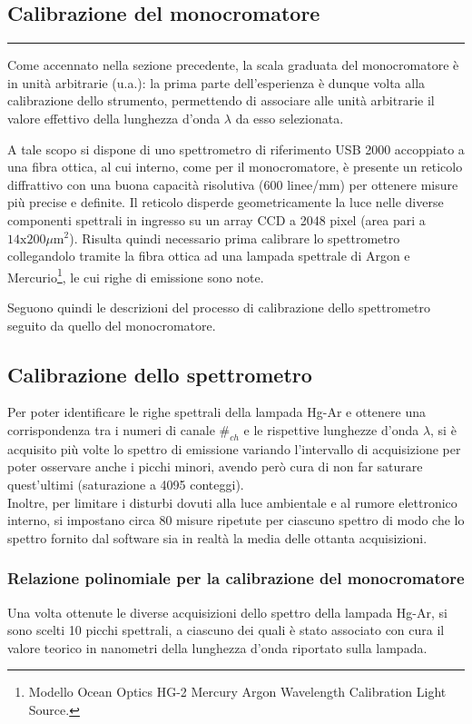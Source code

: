 \begin{center}
  \section{Calibrazione del monocromatore}
\medskip
\end{center}
{\color{gray}\hrule}
\medskip

Come accennato nella sezione precedente, la scala graduata del monocromatore è in unità arbitrarie (u.a.): la prima parte dell'esperienza è dunque volta alla calibrazione dello strumento, permettendo di associare alle unità arbitrarie il valore effettivo della lunghezza d'onda $\lambda$ da esso selezionata. 

A tale scopo si dispone di uno spettrometro di riferimento USB 2000 accoppiato a una fibra ottica, al cui interno, come per il monocromatore, è presente un reticolo diffrattivo con una buona capacità risolutiva ($600$ linee/mm) per ottenere misure più precise e definite. Il reticolo disperde geometricamente la luce nelle diverse componenti spettrali in ingresso su un array CCD a 2048 pixel (area pari a $14 \text{x}200\mu\text{m}^2$). Risulta quindi necessario prima calibrare lo spettrometro collegandolo tramite la fibra ottica ad una lampada spettrale di Argon e Mercurio\footnote{Modello Ocean Optics HG-2 Mercury Argon Wavelength Calibration Light Source.}, le cui righe di emissione sono note.

Seguono quindi le descrizioni del processo di calibrazione dello spettrometro seguito da quello del monocromatore. 


\subsection{Calibrazione dello spettrometro}
Per poter identificare le righe spettrali della lampada Hg-Ar e ottenere una corrispondenza tra i numeri di canale $\#_{ch}$ e le rispettive lunghezze d’onda $\lambda$, si è acquisito più volte lo spettro di emissione variando l'intervallo di acquisizione per poter osservare anche i picchi minori, avendo però cura di non far saturare quest'ultimi (saturazione a 4095 conteggi). \\ Inoltre, per limitare i disturbi dovuti alla luce ambientale e al rumore elettronico interno, si impostano circa 80 misure ripetute per ciascuno spettro di modo che lo spettro fornito dal software sia in realtà la media delle ottanta acquisizioni.

\subsubsection{Relazione polinomiale per la calibrazione del monocromatore}
Una volta ottenute le diverse acquisizioni dello spettro della lampada Hg-Ar, si sono scelti 10 picchi spettrali, a ciascuno dei quali è stato associato con cura il valore teorico in nanometri della lunghezza d'onda riportato sulla lampada. 

